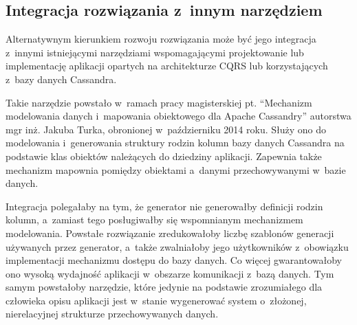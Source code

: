 \subsection{Integracja rozwiązania z~innym narzędziem}

Alternatywnym kierunkiem rozwoju rozwiązania może być jego integracja z~innymi istniejącymi narzędziami wspomagającymi projektowanie lub implementację aplikacji opartych na architekturze CQRS lub korzystających z~bazy danych Cassandra.

Takie narzędzie powstało w~ramach pracy magisterskiej pt. ``Mechanizm modelowania danych i~mapowania obiektowego dla Apache Cassandry'' autorstwa mgr inż. Jakuba Turka, obronionej w~październiku 2014 roku.
Służy ono do modelowania i~generowania struktury rodzin kolumn bazy danych Cassandra na podstawie klas obiektów należących do dziedziny aplikacji.
Zapewnia także mechanizm mapownia pomiędzy obiektami a~danymi przechowywanymi w~bazie danych.

Integracja polegałaby na tym, że generator nie generowałby definicji rodzin kolumn, a~zamiast tego posługiwałby się wspomnianym mechanizmem modelowania.
Powstałe rozwiązanie zredukowałoby liczbę szablonów generacji używanych przez generator, a~także zwalniałoby jego użytkowników z~obowiązku implementacji mechanizmu dostępu do bazy danych.
Co więcej gwarantowałoby ono wysoką wydajność aplikacji w~obszarze komunikacji z~bazą danych.
Tym samym powstałoby narzędzie, które jedynie na podstawie zrozumiałego dla człowieka opisu aplikacji jest w~stanie wygenerować system o~złożonej, nierelacyjnej strukturze przechowywanych danych.
